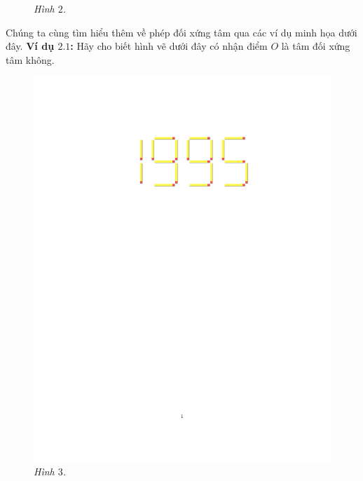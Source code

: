 \begin{multicols}{2}
\begin{figure}[H]
		\caption{\small\textit{\color{toancuabi}Hình $2$.}}
		\vspace*{-10pt}
	\end{figure}
	Chúng ta cùng tìm hiểu thêm về phép đối xứng tâm qua các ví dụ minh họa dưới đây.
	\textbf{\color{toancuabi}Ví dụ $\pmb{2.1}$:} Hãy cho biết hình vẽ dưới đây có nhận điểm $O$ là tâm đối xứng tâm không. 
	\begin{figure}[H]
		\vspace*{-5pt}
		\centering
		\captionsetup{labelformat= empty, justification=centering}
		\includegraphics[width= 0.65\linewidth]{3}
		\caption{\small\textit{\color{toancuabi}Hình $3$.}}
		\vspace*{-5pt}
	\end{figure}
	\end{multicols}
